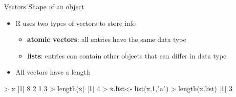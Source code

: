 \documentclass[
  ignorenonframetext,
]{beamer}
\newenvironment{Shaded}{\begin{snugshade}}{\end{snugshade}}
\newcommand{\DecValTok}[1]{\textcolor[rgb]{0.00,0.00,0.81}{#1}}
\newcommand{\FunctionTok}[1]{\textcolor[rgb]{0.00,0.00,0.00}{#1}}
\newcommand{\NormalTok}[1]{#1}
\newcommand{\OtherTok}[1]{\textcolor[rgb]{0.56,0.35,0.01}{#1}}
\newcommand{\SpecialCharTok}[1]{\textcolor[rgb]{0.00,0.00,0.00}{#1}}
\newcommand{\StringTok}[1]{\textcolor[rgb]{0.31,0.60,0.02}{#1}}
\providecommand{\tightlist}{%
  \setlength{\itemsep}{0pt}\setlength{\parskip}{0pt}}
\begin{document}
\begin{frame}[fragile]{Vectors \textbar{} Shape of an object}
\protect\hypertarget{vectors-shape-of-an-object}{}
\begin{itemize}[<+->]
\tightlist
\item
  R uses two types of vectors to store info

  \begin{itemize}[<+->]
  \tightlist
  \item
    \textbf{atomic vectors}: all entries have the same data type
  \item
    \textbf{lists}: entries can contain other objects that can differ in
    data type
  \end{itemize}
\item
  All vectors have a length
\end{itemize}

\begin{Shaded}
\begin{Highlighting}[]
\SpecialCharTok{\textgreater{}}\NormalTok{ x}
\NormalTok{[}\DecValTok{1}\NormalTok{] }\DecValTok{8} \DecValTok{2} \DecValTok{1} \DecValTok{3}
\SpecialCharTok{\textgreater{}} \FunctionTok{length}\NormalTok{(x)}
\NormalTok{[}\DecValTok{1}\NormalTok{] }\DecValTok{4}
\SpecialCharTok{\textgreater{}}\NormalTok{ x.list}\OtherTok{\textless{}{-}} \FunctionTok{list}\NormalTok{(x,}\DecValTok{1}\NormalTok{,}\StringTok{"a"}\NormalTok{)}
\SpecialCharTok{\textgreater{}} \FunctionTok{length}\NormalTok{(x.list)}
\NormalTok{[}\DecValTok{1}\NormalTok{] }\DecValTok{3}
\end{Highlighting}
\end{Shaded}
\end{frame}
\end{document}

